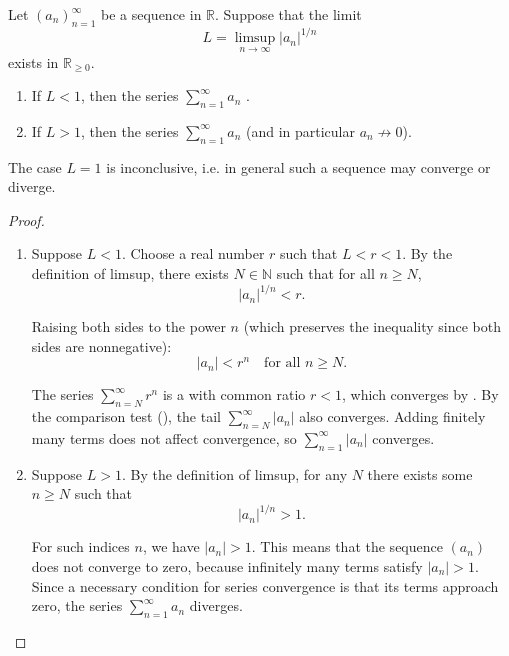 \begin{theorem} \label{theorem:root_test_for_absolute_convergence_of_series}
    Let $(a_n)_{n=1}^\infty$ be a sequence in $\mathbb{R}$. Suppose that the limit
    $$L = \limsup_{n \to \infty} |a_n|^{1/n}$$
     exists in $\mathbb{R}_{\geq 0}$.

    \begin{enumerate}
        \item If $L < 1$, then the series $\sum_{n=1}^\infty a_n$ .
        \item If $L > 1$, then the series $\sum_{n=1}^\infty a_n$  (and in particular $a_n \not\to 0$).
    \end{enumerate}
    The case $L = 1$ is inconclusive, i.e. in general such a sequence may converge or diverge.
\end{theorem}
\begin{proof}
    \begin{enumerate}
        \item Suppose $L < 1$. Choose a real number $r$ such that $L < r < 1$. By the definition of limsup, there exists $N \in \mathbb{N}$ such that for all $n \geq N$,
        $$|a_n|^{1/n} < r.$$

        Raising both sides to the power $n$ (which preserves the inequality since both sides are nonnegative):
        $$|a_n| < r^n \quad \text{for all } n \geq N.$$

        The series $\sum_{n=N}^\infty r^n$ is a  with common ratio $r < 1$, which converges by . By the comparison test (), the tail $\sum_{n=N}^\infty |a_n|$ also converges. Adding finitely many terms does not affect convergence, so $\sum_{n=1}^\infty |a_n|$ converges.

        \item Suppose $L > 1$. By the definition of limsup, for any $N$ there exists some $n \geq N$ such that
        $$|a_n|^{1/n} > 1.$$

        For such indices $n$, we have $|a_n| > 1$. This means that the sequence $(a_n)$ does not converge to zero, because infinitely many terms satisfy $|a_n| > 1$. Since a necessary condition for series convergence is that its terms approach zero, the series $\sum_{n=1}^\infty a_n$ diverges.
    \end{enumerate}
\end{proof}
